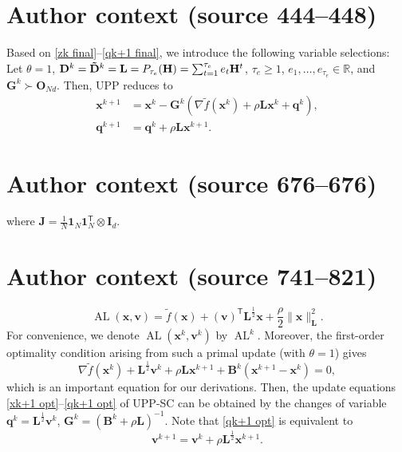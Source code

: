 \documentclass[10pt,a4paper]{amsart}
\begin{document}
\section*{Author context (source 444--448)}

Based on \eqref{zk final}--\eqref{qk+1 final}, we introduce the following variable selections: Let $\theta = 1$, $\mathbf{D}^k=\mathbf{\tilde{D}}^k = \mathbf{L}=P_{\tau_e}({\mathbf{H}})=\sum_{t=1}^{\tau_e} e_t{\mathbf{H}}^t$, $\tau_e\geq 1$, $e_1,\dots,e_{\tau_e}\in \mathbb{R}$, and $\mathbf{G}^k\succ \mathbf{O}_{Nd}$. Then, UPP reduces to
\begin{align}
	\label{xk+1 opt} \mathbf{x}^{k+1} & = \mathbf{x}^k - \mathbf{G}^k (\nabla \tilde{f}(\mathbf{x}^k) + \rho \mathbf{L} \mathbf{x}^k + \mathbf{q}^k),\\
	\label{qk+1 opt} \mathbf{q}^{k+1} &= \mathbf{q}^{k}+\rho \mathbf{L} \mathbf{x}^{k+1}.
\end{align}


\section*{Author context (source 676--676)}

where $\mathbf{J}=\frac{1}{N}\mathbf{1}_N \mathbf{1}_N ^{\mathsf{T}} \otimes \mathbf{I}_d$. 


\section*{Author context (source 741--821)}

	\begin{equation}
		\operatorname{AL}(\mathbf{x},\mathbf{v})=\tilde{f}(\mathbf{x})+(\mathbf{v})^{\mathsf{T}} \mathbf{L}^{\frac{1}{2}}\mathbf{x}+\frac{\rho}{2}\|\mathbf{x}\|^2_\mathbf{L}. \label{AL}
	\end{equation}
	For convenience, we denote $\operatorname{AL}(\mathbf{x}^k,\mathbf{v}^k)$ by $\operatorname{AL}^k$. Moreover, the first-order optimality condition arising from such a primal update (with $\theta=1$) gives
	\begin{equation}
		\label{first-order opt modified} \nabla \tilde{f}(\mathbf{x}^k) + \mathbf{L}^{\frac{1}{2}}\mathbf{v}^k + \rho \mathbf{L} \mathbf{x}^{k+1}+ \mathbf{B}^k(\mathbf{x}^{k+1} - \mathbf{x}^k)=0,
	\end{equation}
	which is an important equation for our derivations. Then, the update equations \eqref{xk+1 opt}--\eqref{qk+1 opt} of UPP-SC can be obtained by the changes of variable $\mathbf{q}^k=\mathbf{L}^{\frac{1}{2}}\mathbf{v}^k$, $\mathbf{G}^k = (\mathbf{B}^k+\rho \mathbf{L})^{-1}$. Note that \eqref{qk+1 opt} is equivalent to 
	\begin{equation}
		\mathbf{v}^{k+1}=\mathbf{v}^k+\rho \mathbf{L}^{\frac{1}{2}}\mathbf{x}^{k+1}. \label{vk+1 opt}
	\end{equation}
\end{document}
